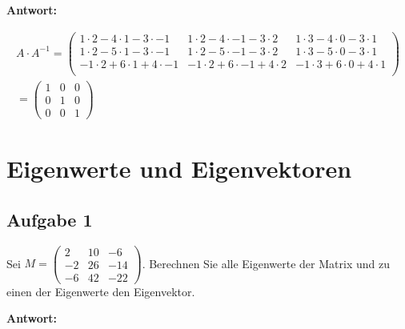 \textbf{Antwort:}

\begin{align*}
    A \cdot A^{-1} = \begin{pmatrix}
                         1 \cdot 2 - 4 \cdot 1 - 3 \cdot -1  & 1 \cdot 2 - 4 \cdot -1 - 3 \cdot 2  & 1 \cdot 3 - 4 \cdot 0 - 3 \cdot 1  \\
                         1 \cdot 2 - 5 \cdot 1 - 3 \cdot -1  & 1 \cdot 2 - 5 \cdot -1 - 3 \cdot 2  & 1 \cdot 3 - 5 \cdot 0 - 3 \cdot 1  \\
                         -1 \cdot 2 + 6 \cdot 1 + 4 \cdot -1 & -1 \cdot 2 + 6 \cdot -1 + 4 \cdot 2 & -1 \cdot 3 + 6 \cdot 0 + 4 \cdot 1 \\
                     \end{pmatrix} \\
    =\begin{pmatrix}
         1 & 0 & 0 \\
         0 & 1 & 0 \\
         0 & 0 & 1
     \end{pmatrix}
\end{align*}

\section{Eigenwerte und Eigenvektoren}

\subsection{Aufgabe 1}

Sei $M = \begin{pmatrix}
        2  & 10 & -6  \\
        -2 & 26 & -14 \\
        -6 & 42 & -22
    \end{pmatrix}$.
Berechnen Sie alle Eigenwerte der Matrix und zu einen der Eigenwerte den Eigenvektor.

\textbf{Antwort:}

